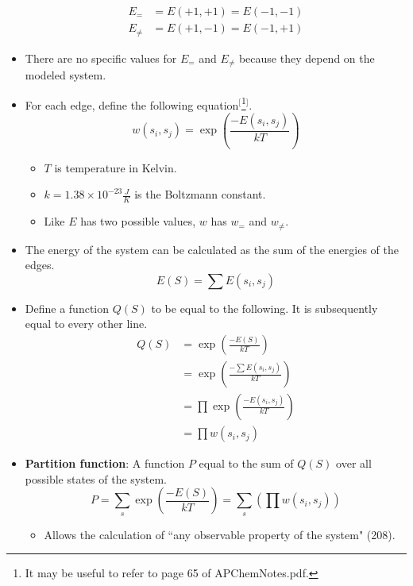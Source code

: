 \documentclass[titlepage]{article}
\numberwithin{figure}{section}
\numberwithin{table}{section}
\numberwithin{equation}{section}
\newcommand{\dq}[2]{``#1" (#2).}
\begin{document}
\begin{itemize}
    \begin{align*}
        E_= &= E(+1,+1) = E(-1,-1)\\
        E_{\neq} &= E(+1,-1) = E(-1,+1)
    \end{align*}
    \item There are no specific values for $E_=$ and $E_{\neq}$ because they depend on the modeled system.
    \item For each edge, define the following equation$^[$\footnote{It may be useful to refer to page 65 of APChemNotes.pdf.}$^]$.
    \begin{equation*}
        w(s_i,s_j) = \exp\left( \frac{-E(s_i,s_j)}{kT} \right)
    \end{equation*}
    \begin{itemize}
        \item $T$ is temperature in Kelvin.
        \item $k=1.38\times 10^{-23} \frac{J}{K}$ is the Boltzmann constant.
        \item Like $E$ has two possible values, $w$ has $w_=$ and $w_{\neq}$.
    \end{itemize}
    \item The energy of the system can be calculated as the sum of the energies of the edges.
    \begin{equation*}
        E(S) = \sum E(s_i,s_j)
    \end{equation*}
    \item Define a function $Q(S)$ to be equal to the following. It is subsequently equal to every other line.
    \begin{align*}
        Q(S) &= \exp\left( \frac{-E(S)}{kT} \right)\\
        &= \exp\left( \frac{-\sum E(s_i,s_j)}{kT} \right)\\
        &= \prod \exp\left( \frac{-E(s_i,s_j)}{kT} \right)\\
        &= \prod w(s_i,s_j)
    \end{align*}
    \item \textbf{Partition function}: A function $P$ equal to the sum of $Q(S)$ over all possible states of the system.
    \begin{equation*}
        P = \sum_s\exp\left( \frac{-E(S)}{kT} \right) = \sum_s\left( \prod w(s_i,s_j) \right)
    \end{equation*}
    \begin{itemize}
        \item Allows the calculation of \dq{any observable property of the system}{208}

\end{itemize}
\end{itemize}
\end{document}
